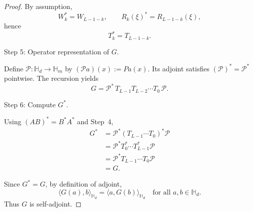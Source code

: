 \documentclass{article}
\theoremstyle{plain}
\theoremstyle{definition}
\theoremstyle{remark}
\newcommand{\inner}[2]{\langle #1, #2 \rangle}
\newcommand{\Hd}{\mathbb{H}_d}
\newcommand{\Hm}{\mathbb{H}_m}
\begin{document}
\begin{proof}
By assumption,
\[
W_k^* = W_{L-1-k},
\qquad
R_k(\xi)^* = R_{L-1-k}(\xi),
\]
hence
\[
T_k^* = T_{L-1-k}.
\]

Step 5: Operator representation of $G$.

Define $\mathcal P:\Hd\to\Hm$ by $(\mathcal P a)(x):=Pa(x)$.
Its adjoint satisfies $(\mathcal P)^*=\mathcal P^*$ pointwise.
The recursion yields
\[
G = \mathcal P^*\, T_{L-1}T_{L-2}\cdots T_0\, \mathcal P.
\]

Step 6: Compute $G^*$.

Using $(AB)^*=B^*A^*$ and Step~4,
\[
\begin{aligned}
G^*
&= \mathcal P^* (T_{L-1}\cdots T_0)^* \mathcal P \\
&= \mathcal P^* T_0^* \cdots T_{L-1}^* \mathcal P \\
&= \mathcal P^* T_{L-1}\cdots T_0 \mathcal P \\
&= G.
\end{aligned}
\]


Since $G^*=G$, by definition of adjoint,
\[
\inner{G(a)}{b}_{\Hd}=\inner{a}{G(b)}_{\Hd}
\quad\text{for all }a,b\in\Hd.
\]
Thus $G$ is self-adjoint.
\end{proof}
\end{document}
